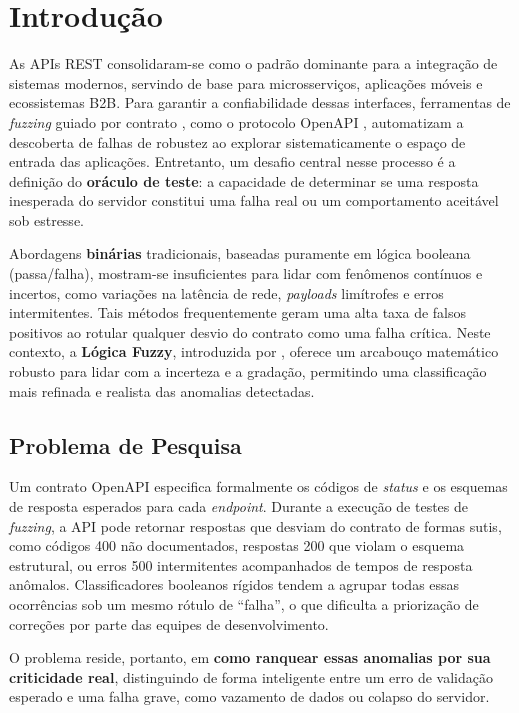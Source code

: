 \section{Introdução}

As APIs REST consolidaram-se como o padrão dominante para a integração de sistemas modernos, servindo de base para microsserviços, aplicações móveis e ecossistemas B2B. Para garantir a confiabilidade dessas interfaces, ferramentas de \textit{fuzzing} guiado por contrato \cite{meyer1992applying}, como o protocolo OpenAPI \cite{openapi}, automatizam a descoberta de falhas de robustez ao explorar sistematicamente o espaço de entrada das aplicações. Entretanto, um desafio central nesse processo é a definição do \textbf{oráculo de teste}: a capacidade de determinar se uma resposta inesperada do servidor constitui uma falha real ou um comportamento aceitável sob estresse.

Abordagens \textbf{binárias} tradicionais, baseadas puramente em lógica booleana (passa/falha), mostram-se insuficientes para lidar com fenômenos contínuos e incertos, como variações na latência de rede, \textit{payloads} limítrofes e erros intermitentes. Tais métodos frequentemente geram uma alta taxa de falsos positivos ao rotular qualquer desvio do contrato como uma falha crítica. Neste contexto, a \textbf{Lógica Fuzzy}, introduzida por \cite{zadeh1965fuzzy}, oferece um arcabouço matemático robusto para lidar com a incerteza e a gradação, permitindo uma classificação mais refinada e realista das anomalias detectadas.

\subsection{Problema de Pesquisa}

Um contrato OpenAPI especifica formalmente os códigos de \textit{status} e os esquemas de resposta esperados para cada \textit{endpoint}. Durante a execução de testes de \textit{fuzzing}, a API pode retornar respostas que desviam do contrato de formas sutis, como códigos 400 não documentados, respostas 200 que violam o esquema estrutural, ou erros 500 intermitentes acompanhados de tempos de resposta anômalos. Classificadores booleanos rígidos tendem a agrupar todas essas ocorrências sob um mesmo rótulo de ``falha'', o que dificulta a priorização de correções por parte das equipes de desenvolvimento.

O problema reside, portanto, em \textbf{como ranquear essas anomalias por sua criticidade real}, distinguindo de forma inteligente entre um erro de validação esperado e uma falha grave, como vazamento de dados ou colapso do servidor.


